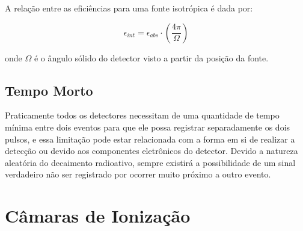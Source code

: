 \documentclass[11pt,a4paper]{article}
\begin{document}
		A relação entre as eficiências para uma fonte isotrópica é dada por:

			\begin{equation}
					\epsilon_{int} = \epsilon_{abs} \cdot \left(\frac{4 \pi}{\Omega}\right)
			\end{equation}

		\noindent onde $\Omega$ é o ângulo sólido do detector visto a partir da posição da fonte.

	\subsection{Tempo Morto}

		Praticamente todos os detectores necessitam de uma quantidade de tempo mínima entre dois eventos para que ele possa registrar separadamente os dois pulsos, e essa limitação pode estar relacionada com a forma em si de realizar a detecção ou devido aos componentes eletrônicos do detector. Devido a natureza aleatória do decaimento radioativo, sempre existirá a possibilidade de um sinal verdadeiro não ser registrado por ocorrer muito próximo a outro evento. 

	\section{Câmaras de Ionização}

		

	

\end{document}
